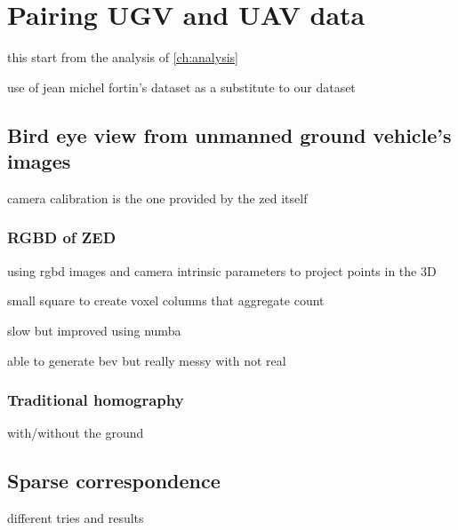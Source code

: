 \chapter{Pairing UGV and UAV data}\label{ch:pairing-ugv-and-uav-data}

this start from the analysis of \ref{ch:analysis}


use of jean michel fortin's dataset as a substitute to our dataset


\section{Bird eye view from unmanned ground vehicle's images}\label{sec:bird-eye-view-from-unmanned-ground-vehicle's-images}

camera calibration is the one provided by the zed itself

\subsection{RGBD of ZED}

using rgbd images and camera intrinsic parameters to project points in the 3D

small square to create voxel columns that aggregate count

slow but improved using numba

able to generate bev but really messy with not real

\subsection{Traditional homography}


with/without the ground


\section{Sparse correspondence}

different tries and results